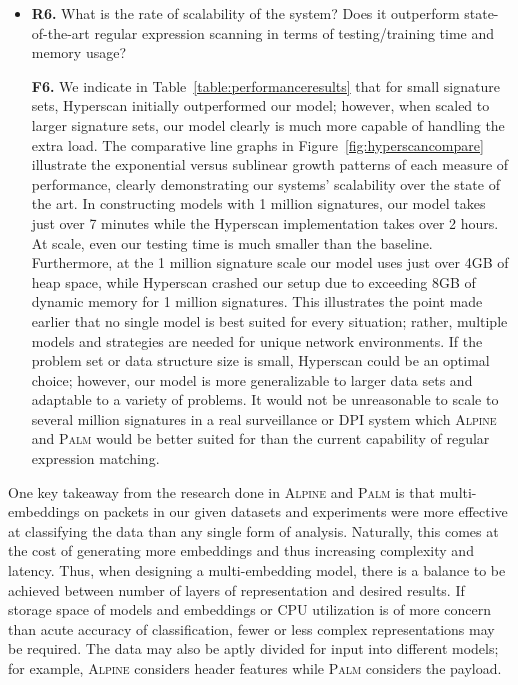 \begin{itemize}
\item\textbf{R6.} What is the rate of scalability of the system? Does it outperform state-of-the-art regular expression scanning in terms of testing/training time and memory usage?

\textbf{F6.} We indicate in Table~\ref{table:performanceresults} that for small signature sets, Hyperscan initially outperformed our model; however, when scaled to larger signature sets, our model clearly is much more capable of handling the extra load. The comparative line graphs in Figure~\ref{fig:hyperscancompare} illustrate the exponential versus sublinear growth patterns of each measure of performance, clearly demonstrating our systems' scalability over the state of the art. In constructing models with 1 million signatures, our model takes just over 7 minutes while the Hyperscan implementation takes over 2 hours. At scale, even our testing time is much smaller than the baseline. Furthermore, at the 1 million signature scale our model uses just over 4GB of heap space, while Hyperscan crashed our setup due to exceeding 8GB of dynamic memory for 1 million signatures. This illustrates the point made earlier that no single model is best suited for every situation; rather, multiple models and strategies are needed for unique network environments. If the problem set or data structure size is small, Hyperscan could be an optimal choice; however, our model is more generalizable to larger data sets and adaptable to a variety of problems. It would not be unreasonable to scale to several million signatures in a real surveillance or DPI system which \textsc{Alpine} and \textsc{Palm} would be better suited for than the current capability of regular expression matching.
\end{itemize}

One key takeaway from the research done in \textsc{Alpine} and \textsc{Palm} is that multi-embeddings on packets in our given datasets and experiments were more effective at classifying the data than any single form of analysis. Naturally, this comes at the cost of generating more embeddings and thus increasing complexity and latency. Thus, when designing a multi-embedding model, there is a balance to be achieved between number of layers of representation and desired results. If storage space of models and embeddings or CPU utilization is of more concern than acute accuracy of classification, fewer or less complex representations may be required. The data may also be aptly divided for input into different models; for example, \textsc{Alpine} considers header features while \textsc{Palm} considers the payload.

